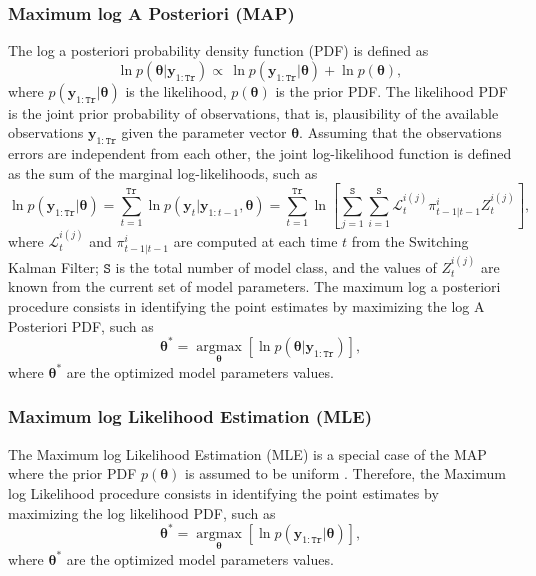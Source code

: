 \subsubsection{Maximum log A Posteriori (MAP)}

The log a posteriori probability density function (PDF) is defined as
\begin{equation}
\ln p(\bm\theta|\mathbf{y}_{1:\mathtt{Tr}})  \propto \, \ln p(\mathbf{y}_{1:\mathtt{Tr}}|\bm\theta) + \ln p(\bm\theta),
\label{EQ:BT}
\end{equation} 
where $p(\mathbf{y}_{1:\mathtt{Tr}}|\bm\theta)$ is the likelihood,  $p(\bm\theta)$ is the prior PDF.
The likelihood PDF is the joint prior probability of observations, that is, plausibility of the available observations $\mathbf{y}_{1:\mathtt{Tr}}$ given the parameter vector $\bm\theta$.  
Assuming that the observations errors are independent from each other, the joint log-likelihood function is defined as the sum of the marginal log-likelihoods, such as 
\begin{equation}
\ln p(\mathbf{y}_{1:\mathtt{Tr}}|\bm\theta)  = \displaystyle\sum_{t=1}^{\mathtt{Tr}} \ln p(\mathbf{y}_{t}|\mathbf{y}_{1:t-1},\bm \theta) = \displaystyle\sum_{t=1}^{\mathtt{Tr}} \ln \left[ \sum_{j=1}^{\mathtt{S}} \sum_{i=1}^{\mathtt{S}} \mathcal{L}_{t}^{i(j)} \pi_{t-1|t-1}^{i} Z_{t}^{i(j)} \right] \text{,}
\label{EQ:LP}
\end{equation}
where $\mathcal{L}_{t}^{i(j)}$ and  $\pi_{t-1|t-1}^{i}$ are computed at each time $t$ from the Switching Kalman Filter; $\mathtt{S}$ is the total number of model class, and the values of $Z_{t}^{i(j)}$ are known from the current set of model parameters.
The maximum log a posteriori procedure consists in identifying the point estimates by maximizing the log A Posteriori PDF, such as
\begin{equation*}
\bm\theta^{*} = \underset{\bm\theta}{\text{arg}\max}\left[\ln p(\bm\theta|\mathbf{y}_{1:\mathtt{Tr}}) \right] \text{,}
\end{equation*}
where $\bm\theta^{*}$ are the optimized model parameters values.

\subsubsection{Maximum log Likelihood Estimation (MLE)}

The Maximum log Likelihood Estimation (MLE) is a special case of the MAP where the prior PDF $p(\bm\theta)$ is assumed to be uniform \cite{gelman2014bayesian}.
Therefore, the Maximum log Likelihood procedure consists in identifying the point estimates by maximizing the log likelihood PDF, such as
\begin{equation*}
\bm\theta^{*} = \underset{\bm\theta}{\text{arg}\max}\left[\ln  p(\mathbf{y}_{1:\mathtt{Tr}}|\bm\theta) \right] \text{,}
\end{equation*}
where $\bm\theta^{*}$ are the optimized model parameters values.


